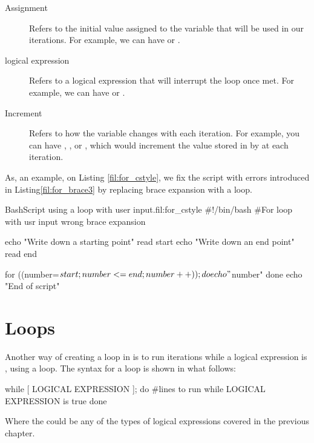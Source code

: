 \begin{description}
\item[Assignment] Refers to the initial value assigned to the variable that will be used in our iterations. For example, we can have  or .
\item[logical expression] Refers to a logical expression that will interrupt the loop once met. For example, we can have  or .
\item[Increment] Refers to how the variable changes with each iteration. For example, you can have , , or , which would increment the value stored in  by  at each iteration.
\end{description}

As, an example, on Listing \ref{fil:for_cstyle}, we fix the script with errors introduced in Listing\ref{fil:for_brace3} by replacing brace expansion with a  loop.

\begin{source_code_float}{Bash}{Script using a  loop with user input.}{fil:for_cstyle}
#!/bin/bash
#For loop with usr input wrong brace expansion 

echo "Write down a starting point"
read start
echo "Write down an end point"
read end

for ((number=$start; number<=end; number++)) ; do
   echo "$number"
done
echo "End of script"
\end{source_code_float}

\section{ Loops}

Another way of creating a loop in  is to run iterations while a logical expression is , using a  loop. The syntax for a  loop is shown in what follows:

\begin{command_line}[Bash]
while [ LOGICAL EXPRESSION ]; do
    #lines to run while LOGICAL EXPRESSION is true
done    
\end{command_line}
Where the  could be any of the types of logical expressions covered in the previous chapter.

